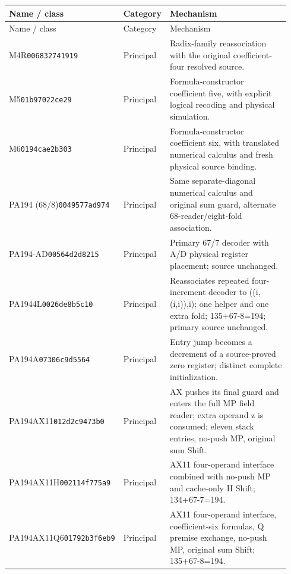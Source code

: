 {\fontsize{8}{9}\selectfont
\begin{longtable}{@{}p{0.23\linewidth}p{0.13\linewidth}p{0.58\linewidth}@{}}
\toprule Name / class & Category & Mechanism\\\midrule\endfirsthead
\toprule Name / class & Category & Mechanism\\\midrule\endhead
M4R\newline\texttt{006832741919} & Principal & Radix-family reassociation with the original coefficient-four resolved source.\\[2.5pt]
M5\newline\texttt{01b97022ce29} & Principal & Formula-constructor coefficient five, with explicit logical recoding and physical simulation.\\[2.5pt]
M6\newline\texttt{0194cae2b303} & Principal & Formula-constructor coefficient six, with translated numerical calculus and fresh physical source binding.\\[2.5pt]
PA194 (68/8)\newline\texttt{0049577ad974} & Principal & Same separate-diagonal numerical calculus and original sum guard, alternate 68-reader/eight-fold association.\\[2.5pt]
PA194-AD\newline\texttt{00564d2d8215} & Principal & Primary 67/7 decoder with A/D physical register placement; source unchanged.\\[2.5pt]
PA1944L\newline\texttt{0026de8b5c10} & Principal & Reassociates repeated four-increment decoder to ((i,(i,i)),i); one helper and one extra fold; 135+67-8=194; primary source unchanged.\\[2.5pt]
PA194A\newline\texttt{07306c9d5564} & Principal & Entry jump becomes a decrement of a source-proved zero register; distinct complete initialization.\\[2.5pt]
PA194AX11\newline\texttt{012d2c9473b0} & Principal & AX pushes its final guard and enters the full MP field reader; extra operand z is consumed; eleven stack entries, no-push MP, original sum Shift.\\[2.5pt]
PA194AX11H\newline\texttt{002114f775a9} & Principal & AX11 four-operand interface combined with no-push MP and cache-only H Shift; 134+67-7=194.\\[2.5pt]
PA194AX11Q6\newline\texttt{01792b3f6eb9} & Principal & AX11 four-operand interface, coefficient-six formulas, Q premise exchange, no-push MP, original sum Shift; 135+67-8=194.\\[2.5pt]

\end{longtable}}
